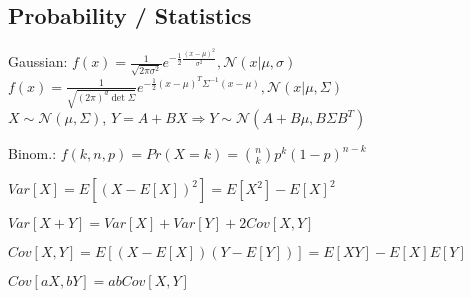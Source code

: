 \subsection*{Probability / Statistics}
\begin{inparaitem}[\color{black}\textbullet]
    \item Gaussian:
    $f(x) = \frac{1}{\sqrt{2\pi \sigma^2}} e^{- \frac{1}{2} \frac{(x-\mu)^2}{\sigma^2}}, \mathcal{N}(x|\mu, \sigma)$\\
    $f(x) = \frac{1}{\sqrt{(2\pi)^d\det\Sigma}} e^{- \frac{1}{2} (x-\mu)^T \Sigma^{-1} (x-\mu)}, \mathcal{N}(x|\mu, \Sigma)$\\
    $X {\sim} \mathcal{N}(\mu,\Sigma)$, $Y{=}A{+}BX \Rightarrow Y{\sim}\mathcal{N}(A{+}B\mu,B\Sigma B^T)$\\
    \item Binom.: $f(k,n,p) {=} Pr(X=k) {=} \binom nk p^k (1{-}p)^{n{-}k}$

\item $Var[X]=E[(X-E[X])^2]=E[X^2]-E[X]^2$ \\
\item $Var[X{+}Y]=Var[X]{+}Var[Y]{+}2Cov[X,Y]$ \\
\item $Cov[X,Y] = E[(X - E[X])(Y - E[Y])] = E[XY] - E[X]E[Y]$ \\
\item $Cov[aX,bY]{=}abCov[X,Y]$
\end{inparaitem}

